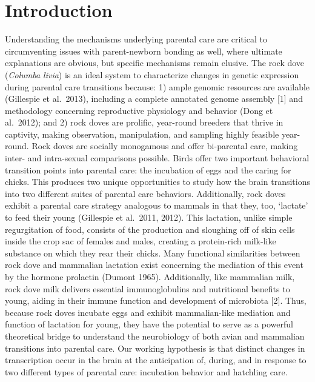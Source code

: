 \documentclass[10pt,letterpaper]{article}
\begin{document}

\linenumbers

\hypertarget{introduction}{%
\section{Introduction}\label{introduction}}

Understanding the mechanisms underlying parental care are critical to
circumventing issues with parent-newborn bonding as well, where ultimate
explanations are obvious, but specific mechanisms remain elusive. The
rock dove (\emph{Columba livia}) is an ideal system to characterize
changes in genetic expression during parental care transitions because:
1) ample genomic resources are available (Gillespie et al.~2013),
including a complete annotated genome assembly {[}1{]} and methodology
concerning reproductive physiology and behavior (Dong et al.~2012); and
2) rock doves are prolific, year-round breeders that thrive in
captivity, making observation, manipulation, and sampling highly
feasible year-round. Rock doves are socially monogamous and offer
bi-parental care, making inter- and intra-sexual comparisons possible.
Birds offer two important behavioral transition points into parental
care: the incubation of eggs and the caring for chicks. This produces
two unique opportunities to study how the brain transitions into two
different suites of parental care behaviors. Additionally, rock doves
exhibit a parental care strategy analogous to mammals in that they, too,
`lactate' to feed their young (Gillespie et al.~2011, 2012). This
lactation, unlike simple regurgitation of food, consists of the
production and sloughing off of skin cells inside the crop sac of
females and males, creating a protein-rich milk-like substance on which
they rear their chicks. Many functional similarities between rock dove
and mammalian lactation exist concerning the mediation of this event by
the hormone prolactin (Dumont 1965). Additionally, like mammalian milk,
rock dove milk delivers essential immunoglobulins and nutritional
benefits to young, aiding in their immune function and development of
microbiota {[}2{]}. Thus, because rock doves incubate eggs and exhibit
mammalian-like mediation and function of lactation for young, they have
the potential to serve as a powerful theoretical bridge to understand
the neurobiology of both avian and mammalian transitions into parental
care. Our working hypothesis is that distinct changes in transcription
occur in the brain at the anticipation of, during, and in response to
two different types of parental care: incubation behavior and hatchling
care.
\end{document}
